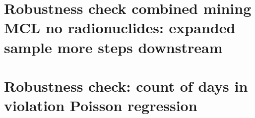 \documentclass{beamer}
\begin{document}
\begin{frame}{}

\end{frame}

\section{Robustness check combined mining MCL no radionuclides: expanded sample more steps downstream}

\begin{frame}{}

\end{frame}

\begin{frame}{}

\end{frame}

\begin{frame}{}

\end{frame}

\begin{frame}{}

\end{frame}

\section{Robustness check: count of days in violation Poisson regression}
\end{document}
